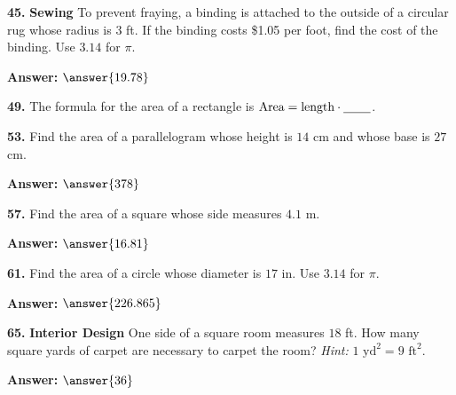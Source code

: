 \documentclass{ximera}
\begin{document}
\begin{problem}
\textbf{45.} \textbf{Sewing} To prevent fraying, a binding is attached to the outside of a
  circular rug whose radius is $3$ ft. If the binding costs \$1.05 per foot, find the
  cost of the binding. Use $3.14$ for $\pi$.

\textbf{Answer:} $\answer{19.78}$
\end{problem}

\begin{problem}
\textbf{49.} The formula for the area of a rectangle is
  $\text{Area} = \text{length} \cdot \underline{\hspace{2.2em}}$.

\begin{multipleChoice}
\end{multipleChoice}
\end{problem}

\begin{problem}
\textbf{53.} Find the area of a parallelogram whose height is $14$ cm and whose base is
  $27$ cm.

\textbf{Answer:} $\answer{378}$
\end{problem}

\begin{problem}
\textbf{57.} Find the area of a square whose side measures $4.1$ m.

\textbf{Answer:} $\answer{16.81}$
\end{problem}

\begin{problem}
\textbf{61.} Find the area of a circle whose diameter is $17$ in. Use $3.14$ for $\pi$.

\textbf{Answer:} $\answer{226.865}$
\end{problem}

\begin{problem}
\textbf{65.} \textbf{Interior Design} One side of a square room measures $18$ ft. How many
  square yards of carpet are necessary to carpet the room?
  \emph{Hint:} $1\text{ yd}^2 = 9\text{ ft}^2$.

\textbf{Answer:} $\answer{36}$
\end{problem}
\end{document}
